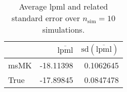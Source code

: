 \begin{table}[H]

\caption{Average lpml and related standard error over $n_{\text{sim}} = 10$ simulations.}
\centering
\begin{tabular}[t]{lrr}
\toprule
  & $\overbar{\text{lpml}}$ & $\text{sd}(\overbar{\text{lpml}})$\\
\midrule
msMK & -18.11398 & 0.1062645\\
True & -17.89845 & 0.0847478\\
\bottomrule
\end{tabular}
\end{table}